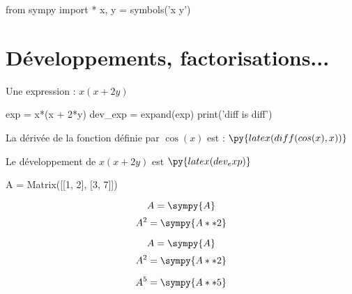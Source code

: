\documentclass[12pt,a4paper]{article}
\begin{document}
\begin{pycode}
from sympy import *
x, y = symbols('x y')
\end{pycode}



\section{Développements, factorisations...}
Une expression : $x(x + 2y)$
\begin{pycode}
exp = x*(x + 2*y)
dev_exp = expand(exp)
print('diff is diff')
\end{pycode}


La dérivée de la fonction définie par $\cos(x)$ est : $\py{latex(diff(cos(x), x))}$

Le développement de $x(x + 2y)$ est $\py{latex(dev_exp)}$



\begin{sympycode}
A = Matrix([[1, 2], [3, 7]])
\end{sympycode}
%
\begin{equation}
 A 
 =
\sympy{A}
\end{equation}
%
%
\begin{equation*}
 A^2 
 =
\sympy{A**2}
\end{equation*}


\begin{equation}
     A 
     =
\sympy{A}
\end{equation}
\begin{equation*}
     A^2 
     =
\sympy{A**2}
\end{equation*}
    

    \begin{align*}
        A^5
        =
    \sympy{A**5}
    \end{align*}
       
\end{document}
